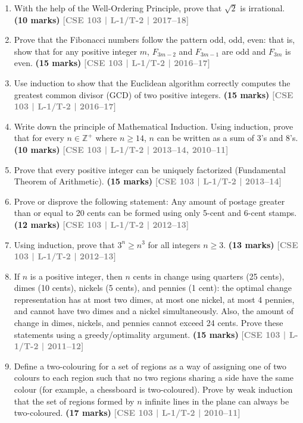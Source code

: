 \documentclass[12pt,a3paper]{article}
\newcommand{\yr}[1]{\hfill\textcolor{gray}{\small\textbf{[#1]}}}
\newcommand{\mk}[1]{\textcolor{orange!70!black}{\small\textbf{(#1 marks)}}}
\begin{document}
\begin{enumerate}
\item With the help of the Well-Ordering Principle, prove that $\sqrt{2}$ is irrational.
\mk{10} \yr{CSE 103 | L-1/T-2 | 2017--18}  

\item Prove that the Fibonacci numbers follow the pattern odd, odd, even: that is, show that for any positive integer $m$, $F_{3m-2}$ and $F_{3m-1}$ are odd and $F_{3m}$ is even.
\mk{15} \yr{CSE 103 | L-1/T-2 | 2016--17}

\item Use induction to show that the Euclidean algorithm correctly computes the greatest common divisor (GCD) of two positive integers.
\mk{15} \yr{CSE 103 | L-1/T-2 | 2016--17}

\item Write down the principle of Mathematical Induction. Using induction, prove that for every $n \in \mathbb{Z}^+$ where $n \geq 14$, $n$ can be written as a sum of 3's and 8's.
\mk{10} \yr{CSE 103 | L-1/T-2 | 2013--14, 2010--11}

\item Prove that every positive integer can be uniquely factorized (Fundamental Theorem of Arithmetic).
\mk{15} \yr{CSE 103 | L-1/T-2 | 2013--14}

\item Prove or disprove the following statement: Any amount of postage greater than or equal to 20 cents can be formed using only 5-cent and 6-cent stamps.
\mk{12} \yr{CSE 103 | L-1/T-2 | 2012--13}

\item Using induction, prove that $3^n \geq n^3$ for all integers $n \geq 3$.
\mk{13} \yr{CSE 103 | L-1/T-2 | 2012--13}

\item If $n$ is a positive integer, then $n$ cents in change using quarters (25 cents), dimes (10 cents), nickels (5 cents), and pennies (1 cent): the optimal change representation has at most two dimes, at most one nickel, at most 4 pennies, and cannot have two dimes and a nickel simultaneously. Also, the amount of change in dimes, nickels, and pennies cannot exceed 24 cents. Prove these statements using a greedy/optimality argument.
\mk{15} \yr{CSE 103 | L-1/T-2 | 2011--12}  

\item Define a two-colouring for a set of regions as a way of assigning one of two colours to each region such that no two regions sharing a side have the same colour (for example, a chessboard is two-coloured). Prove by weak induction that the set of regions formed by $n$ infinite lines in the plane can always be two-coloured.
\mk{17} \yr{CSE 103 | L-1/T-2 | 2010--11}



\end{enumerate}
\end{document}
